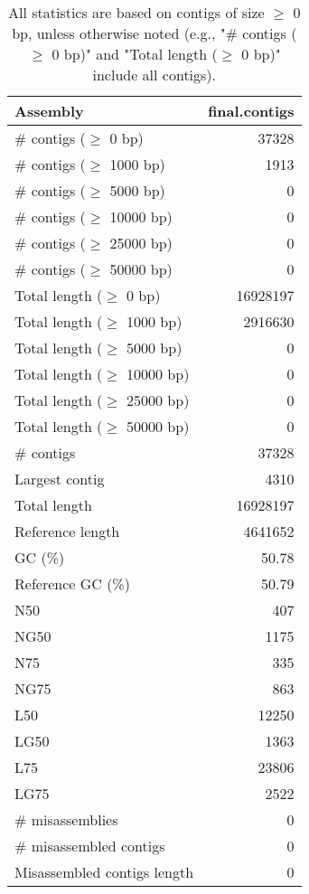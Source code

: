 \documentclass[12pt,a4paper]{article}
\begin{document}
\begin{table}[ht]
\begin{center}
\caption{All statistics are based on contigs of size $\geq$ 0 bp, unless otherwise noted (e.g., "\# contigs ($\geq$ 0 bp)" and "Total length ($\geq$ 0 bp)" include all contigs).}
\begin{tabular}{|l*{1}{|r}|}
\hline
Assembly & final.contigs \\ \hline
\# contigs ($\geq$ 0 bp) & 37328 \\ \hline
\# contigs ($\geq$ 1000 bp) & 1913 \\ \hline
\# contigs ($\geq$ 5000 bp) & 0 \\ \hline
\# contigs ($\geq$ 10000 bp) & 0 \\ \hline
\# contigs ($\geq$ 25000 bp) & 0 \\ \hline
\# contigs ($\geq$ 50000 bp) & 0 \\ \hline
Total length ($\geq$ 0 bp) & 16928197 \\ \hline
Total length ($\geq$ 1000 bp) & 2916630 \\ \hline
Total length ($\geq$ 5000 bp) & 0 \\ \hline
Total length ($\geq$ 10000 bp) & 0 \\ \hline
Total length ($\geq$ 25000 bp) & 0 \\ \hline
Total length ($\geq$ 50000 bp) & 0 \\ \hline
\# contigs & 37328 \\ \hline
Largest contig & 4310 \\ \hline
Total length & 16928197 \\ \hline
Reference length & 4641652 \\ \hline
GC (\%) & 50.78 \\ \hline
Reference GC (\%) & 50.79 \\ \hline
N50 & 407 \\ \hline
NG50 & 1175 \\ \hline
N75 & 335 \\ \hline
NG75 & 863 \\ \hline
L50 & 12250 \\ \hline
LG50 & 1363 \\ \hline
L75 & 23806 \\ \hline
LG75 & 2522 \\ \hline
\# misassemblies & 0 \\ \hline
\# misassembled contigs & 0 \\ \hline
Misassembled contigs length & 0 \\ \hline

\end{tabular}
\end{center}
\end{table}
\end{document}

